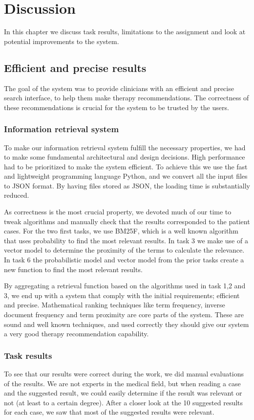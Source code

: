 \chapter{Discussion}
\label{cha:discussion}
In this chapter we discuss task results, limitations to the assignment and look at potential improvements to the system. 

\section{Efficient and precise results}
The goal of the system was to provide clinicians with an efficient and precise search interface, to help them make therapy recommendations. The correctness of these recommendations is crucial for the system to be trusted by the users.

\subsection{Information retrieval system}
To make our information retrieval system fulfill the necessary properties, we had to make some fundamental architectural and design decisions.
High performance had to be prioritized to make the system efficient. To achieve this we use the fast and lightweight programming language Python, and we convert all the input files to JSON format. By having files stored as JSON, the loading time is substantially reduced.

As correctness is the most crucial property, we devoted much of our time to tweak algorithms and manually check that the results corresponded to the patient cases. For the two first tasks, we use BM25F, which is a well known algorithm that uses probability to find the most relevant results. In task 3 we make use of a vector model to determine the proximity of the terms to calculate the relevance. In task 6 the probabilistic model and vector model from the prior tasks create a new function to find the most relevant results.    

By aggregating a retrieval function based on the algorithms used in task 1,2 and 3, we end up with a system that comply with the initial requirements; efficient and precise. Mathematical ranking techniques like term frequency, inverse document frequency and term proximity are core parts of the system. These are sound and well known techniques, and used correctly they should give our system a very good therapy recommendation capability.

\subsection{Task results}
To see that our results were correct during the work, we did manual evaluations of the results. We are not experts in the medical field, but when reading a case and the suggested result, we could easily determine if the result was relevant or not (at least to a certain degree). After a closer look at the 10 suggested results for each case, we saw that most of the suggested results were relevant.

